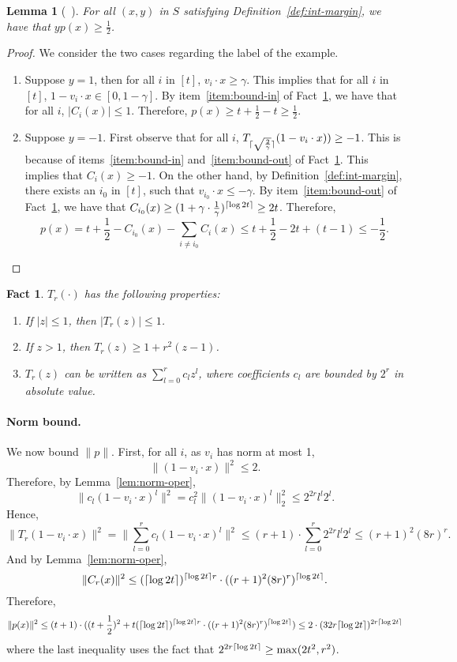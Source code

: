 \documentclass{article}
\DeclarePairedDelimiter\ceil{\lceil}{\rceil}
\newtheorem{lemma}[theorem]{Lemma}
\newtheorem{fact}[theorem]{Fact}
\begin{document}
\begin{lemma}[~\cite{klivans2004learning}]
For all $(x,y)$ in $S$ satisfying Definition~\ref{def:int-margin}, we have that $y p(x) \geq \frac 1 2$.
\end{lemma}
\begin{proof}
We consider the two cases regarding the label of the example.
\begin{enumerate}
\item Suppose $y = 1$, then for all $i$ in $[t]$, $v_i \cdot x \geq \gamma$. This implies that for all
$i$ in $[t]$, $1 - v_i \cdot x \in [0, 1-\gamma]$. By item~\ref{item:bound-in} of Fact~\ref{fact:cheb}, we have that for all $i$, $|C_i(x)| \leq 1$.
Therefore, $p(x) \geq t + \frac 1 2 - t \geq \frac 1 2$.

\item Suppose $y = -1$. First observe that for all $i$, $T_{\ceil{\sqrt{\frac 2 \gamma}}}(1 - v_i \cdot x)) \geq -1$. This is because of items~\ref{item:bound-in} and~\ref{item:bound-out} of Fact~\ref{fact:cheb}.
This implies that $C_i(x) \geq -1$.
On the other hand, by Definition~\ref{def:int-margin}, there exists an $i_0$ in $[t]$, such that $v_{i_0} \cdot x \leq -\gamma$. By item~\ref{item:bound-out} of Fact~\ref{fact:cheb}, we have that
$C_{i_0}(x) \geq (1 + \gamma \cdot \frac 1 \gamma)^{\ceil{\log 2t}} \geq 2t$. Therefore,
\[ p(x) = t + \frac 1 2 - C_{i_0}(x) - \sum_{i \neq i_0} C_i(x) \leq t + \frac 1 2 - 2t + (t-1) \leq -\frac 1 2. \]
\end{enumerate}
\end{proof}

\begin{fact}
$T_r(\cdot)$ has the following properties:
\begin{enumerate}
  \item If $|z| \leq 1$, then $|T_r(z)| \leq 1$. \label{item:bound-in}
  \item If $z > 1$, then $T_r(z) \geq 1 + r^2 (z-1)$. \label{item:bound-out}
  \item $T_r(z)$ can be written as $\sum_{l=0}^r c_l z^l$, where coefficients $c_l$ are bounded by $2^r$ in absolute value.
\end{enumerate}
\label{fact:cheb}
\end{fact}

\paragraph{Norm bound.} We now bound $\| p \|$. First, for all $i$, as $v_i$ has norm at most 1,
\[ \| (1 - v_i \cdot x) \|^2 \leq 2. \]
Therefore, by Lemma~\ref{lem:norm-oper},
\[ \| c_l (1 - v_i \cdot x)^l \|^2 = c_l^2 \| (1 - v_i \cdot x)^l \|_2^2 \leq 2^{2r} l^l 2^l. \]
Hence,
\[ \| T_r(1 - v_i \cdot x) \|^2 = \| \sum_{l=0}^r c_l (1 - v_i \cdot x)^l \|^2 \leq (r+1) \cdot \sum_{l=0}^r 2^{2r} l^l 2^l \leq (r+1)^2 (8r)^r. \]
And by Lemma~\ref{lem:norm-oper},
\[ \| C_r(x) \|^2 \leq (\ceil{\log 2t})^{\ceil{\log 2t} r} \cdot ((r+1)^2 (8r)^r)^{\ceil{\log 2t}}. \]
Therefore,
\[ \| p(x) \|^2 \leq (t+1) \cdot ((t+\frac 1 2)^2 + t (\ceil{\log 2t})^{\ceil{\log 2t} r} \cdot ((r+1)^2 (8r)^r)^{\ceil{\log 2t}}) \leq 2 \cdot (32 r \ceil{\log 2t})^{2r \ceil{\log 2t}}  \]
where the last inequality uses the fact that $2^{2r \ceil{\log 2t}} \geq \max(2t^2, r^2)$.
\end{document}
